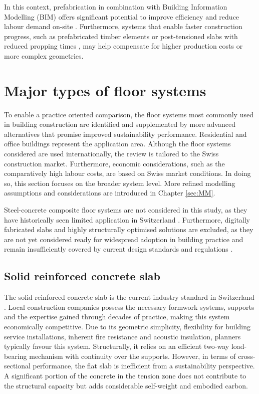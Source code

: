 In this context, prefabrication in combination with Building Information Modelling (BIM) offers significant potential to improve efficiency and reduce labour demand on-site \cite{Caulfield2022}. Furthermore, systems that enable faster construction progress, such as prefabricated timber elements or post-tensioned slabs with reduced propping times \cite{Rombach2010}, may help compensate for higher production costs or more complex geometries.


\section{Major types of floor systems\label{Sec: FloorSyst}}
To enable a practice oriented comparison, the floor systems most commonly used in building construction are identified and supplemented by more advanced alternatives that promise improved sustainability performance. Residential and office buildings represent the application area. Although the floor systems considered are used internationally, the review is tailored to the Swiss construction market. Furthermore, economic considerations, such as the comparatively high labour costs, are based on Swiss market conditions. In doing so, this section focuses on the broader system level. More refined modelling assumptions and considerations are introduced in Chapter \ref{sec:MM}.

Steel-concrete composite floor systems are not considered in this study, as they have historically seen limited application in Switzerland \cite{Mensinger2010}. Furthermore, digitally fabricated slabs and highly structurally optimised solutions are excluded, as they are not yet considered ready for widespread adoption in building practice and remain insufficiently covered by current design standards and regulations \cite{Wangler2019, Ranaudo2021HiLo}.


\newpage
\subsection{Solid reinforced concrete slab \label{Sec: LR_RecConc}}
The solid reinforced concrete slab is the current industry standard in Switzerland \cite{Ammann2024}. Local construction companies possess the necessary formwork systems, supports and the expertise gained through decades of practice, making this system economically competitive. Due to its geometric simplicity, flexibility for building service installations, inherent fire resistance and acoustic insulation, planners typically favour this system. Structurally, it relies on an efficient two-way load-bearing mechanism with continuity over the supports. However, in terms of cross-sectional performance, the flat slab is inefficient from a sustainability perspective. A significant portion of the concrete in the tension zone does not contribute to the structural capacity but adds considerable self-weight and embodied carbon.

